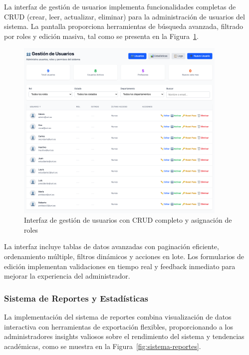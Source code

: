 \documentclass[12pt,a4paper,oneside]{report}
\begin{document}
La interfaz de gestión de usuarios implementa funcionalidades completas de CRUD (crear, leer, actualizar, eliminar) para la administración de usuarios del sistema. La pantalla proporciona herramientas de búsqueda avanzada, filtrado por roles y edición masiva, tal como se presenta en la Figura~\ref{fig:gestion-usuarios}.

\begin{figure}[H]
\centering
\includegraphics[width=0.9\textwidth]{processed/images/gestion_usuarios.png}
\caption{Interfaz de gestión de usuarios con CRUD completo y asignación de roles}
\label{fig:gestion-usuarios}
\end{figure}

La interfaz incluye tablas de datos avanzadas con paginación eficiente, ordenamiento múltiple, filtros dinámicos y acciones en lote. Los formularios de edición implementan validaciones en tiempo real y feedback inmediato para mejorar la experiencia del administrador.

\subsubsection{Sistema de Reportes y Estadísticas}\label{sistema-de-reportes-y-estadisticas}

La implementación del sistema de reportes combina visualización de datos interactiva con herramientas de exportación flexibles, proporcionando a los administradores insights valiosos sobre el rendimiento del sistema y tendencias académicas, como se muestra en la Figura~\ref{fig:sistema-reportes}.
\end{document}
